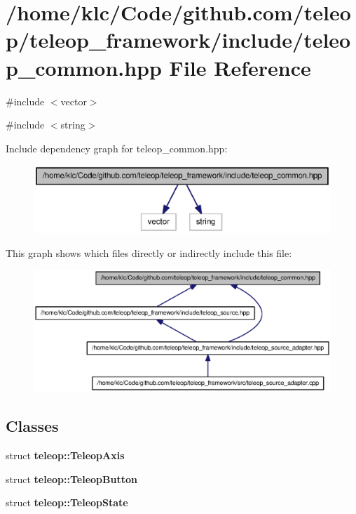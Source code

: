\section{/home/klc/Code/github.com/teleop/teleop\_\-framework/include/teleop\_\-common.hpp File Reference}
\label{teleop__common_8hpp}
{\ttfamily \#include $<$vector$>$}\par
{\ttfamily \#include $<$string$>$}\par
Include dependency graph for teleop\_\-common.hpp:
\nopagebreak
\begin{figure}[H]
\begin{center}
\leavevmode
\includegraphics[width=400pt]{teleop__common_8hpp__incl}
\end{center}
\end{figure}
This graph shows which files directly or indirectly include this file:
\nopagebreak
\begin{figure}[H]
\begin{center}
\leavevmode
\includegraphics[width=400pt]{teleop__common_8hpp__dep__incl}
\end{center}
\end{figure}
\subsection*{Classes}
\begin{DoxyCompactItemize}
\item 
struct {\bf teleop::TeleopAxis}
\item 
struct {\bf teleop::TeleopButton}
\item 
struct {\bf teleop::TeleopState}
\end{DoxyCompactItemize}
